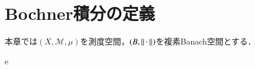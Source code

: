 \section{Bochner積分の定義}
	本章では$(X,\mathcal{M},\mu)$を測度空間，$(B,\left\|\, \cdot\, \right\|_{})$を複素Banach空間とする．
	
	\begin{screen}
		\begin{lem}[距離空間値の可測関数列の極限は可測]
			
		\end{lem}
	\end{screen}
	
	\begin{screen}
		\begin{dfn}[Bochner積分]
			e
		\end{dfn}
	\end{screen}